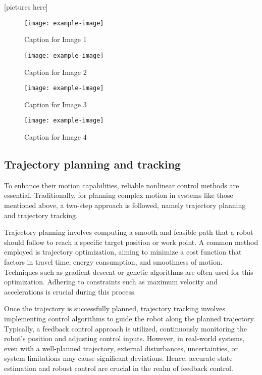 [pictures here]
\begin{figure}[h]
  \centering
  \begin{minipage}[b]{0.45\textwidth}
    \centering
    \texttt{[image: example-image]}
    \caption{Caption for Image 1}
    \label{fig:image1}
  \end{minipage}
  \hfill
  \begin{minipage}[b]{0.45\textwidth}
    \centering
    \texttt{[image: example-image]}
    \caption{Caption for Image 2}
    \label{fig:image2}
  \end{minipage}
  
  \vspace{1em} %

  \begin{minipage}[b]{0.45\textwidth}
    \centering
    \texttt{[image: example-image]}
    \caption{Caption for Image 3}
    \label{fig:image3}
  \end{minipage}
  \hfill
  \begin{minipage}[b]{0.45\textwidth}
    \centering
    \texttt{[image: example-image]}
    \caption{Caption for Image 4}
    \label{fig:image4}
  \end{minipage}
\end{figure}



\subsection{Trajectory planning and tracking}
To enhance their motion capabilities, reliable nonlinear control methods are essential. Traditionally, for planning complex motion in systems like those mentioned above, a two-step approach is followed, namely trajectory planning and trajectory tracking.

Trajectory planning involves computing a smooth and feasible path that a robot should follow to reach a specific target position or work point. A common method employed is trajectory optimization, aiming to minimize a cost function that factors in travel time, energy consumption, and smoothness of motion. Techniques such as gradient descent or genetic algorithms are often used for this optimization. Adhering to constraints such as maximum velocity and accelerations is crucial during this process.

Once the trajectory is successfully planned, trajectory tracking involves implementing control algorithms to guide the robot along the planned trajectory. Typically, a feedback control approach is utilized, continuously monitoring the robot's position and adjusting control inputs. However, in real-world systems, even with a well-planned trajectory, external disturbances, uncertainties, or system limitations may cause significant deviations. Hence, accurate state estimation and robust control are crucial in the realm of feedback control.

